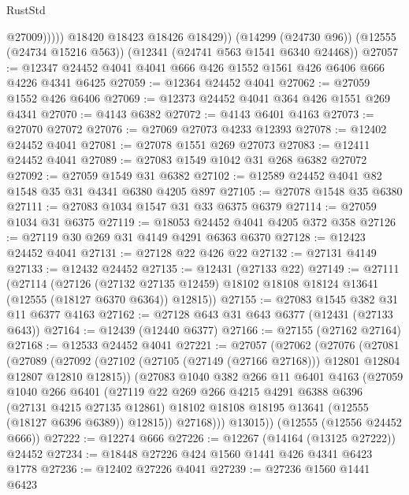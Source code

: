 \begin{lexlean}{RustStd}
\begin{coremodule}
                  @27009)))))
        @18420
        @18423
        @18426
        @18429))
    (@14299 (@24730 @96))
    (@12555 (@24734 @15216 @563))
    (@12341 (@24741 @563 @1541 @6340 @24468))
@27057 := @12347 @24452 @4041 @4041 @666 @426 @1552 @1561 @426 @6406 @666 @4226 @4341 @6425
@27059 := @12364 @24452 @4041
@27062 := @27059 @1552 @426 @6406
@27069 := @12373 @24452 @4041 @364 @426 @1551 @269 @4341
@27070 := @4143 @6382
@27072 := @4143 @6401 @4163
@27073 := @27070 @27072
@27076 := @27069 @27073 @4233 @12393
@27078 := @12402 @24452 @4041
@27081 := @27078 @1551 @269 @27073
@27083 := @12411 @24452 @4041
@27089 := @27083 @1549 @1042 @31 @268 @6382 @27072
@27092 := @27059 @1549 @31 @6382
@27102 := @12589 @24452 @4041 @82 @1548 @35 @31 @4341 @6380 @4205 @897
@27105 := @27078 @1548 @35 @6380
@27111 := @27083 @1034 @1547 @31 @33 @6375 @6379
@27114 := @27059 @1034 @31 @6375
@27119 := @18053 @24452 @4041 @4205 @372 @358
@27126 := @27119 @30 @269 @31 @4149 @4291 @6363 @6370
@27128 := @12423 @24452 @4041
@27131 := @27128 @22 @426 @22
@27132 := @27131 @4149
@27133 := @12432 @24452
@27135 := @12431 (@27133 @22)
@27149 := @27111
    (@27114
      (@27126
        (@27132 @27135 @12459)
        @18102
        @18108
        @18124
        @13641
        (@12555 (@18127 @6370 @6364))
        @12815))
@27155 := @27083 @1545 @382 @31 @11 @6377 @4163
@27162 := @27128 @643 @31 @643 @6377 (@12431 (@27133 @643))
@27164 := @12439 (@12440 @6377)
@27166 := @27155 (@27162 @27164)
@27168 := @12533 @24452 @4041
@27221 := @27057
    (@27062
      (@27076
        (@27081
          (@27089
            (@27092 (@27102 (@27105 (@27149 (@27166 @27168))) @12801 @12804 @12807 @12810 @12815))
            (@27083
              @1040
              @382
              @266
              @11
              @6401
              @4163
              (@27059
                @1040
                @266
                @6401
                (@27119
                  @22
                  @269
                  @266
                  @4215
                  @4291
                  @6388
                  @6396
                  (@27131 @4215 @27135 @12861)
                  @18102
                  @18108
                  @18195
                  @13641
                  (@12555 (@18127 @6396 @6389))
                  @12815))
              @27168)))
        @13015))
    (@12555 (@12556 @24452 @666))
@27222 := @12274 @666
@27226 := @12267 (@14164 (@13125 @27222)) @24452
@27234 := @18448 @27226 @424 @1560 @1441 @426 @4341 @6423 @1778
@27236 := @12402 @27226 @4041
@27239 := @27236 @1560 @1441 @6423

\end{coremodule}
\end{lexlean}
